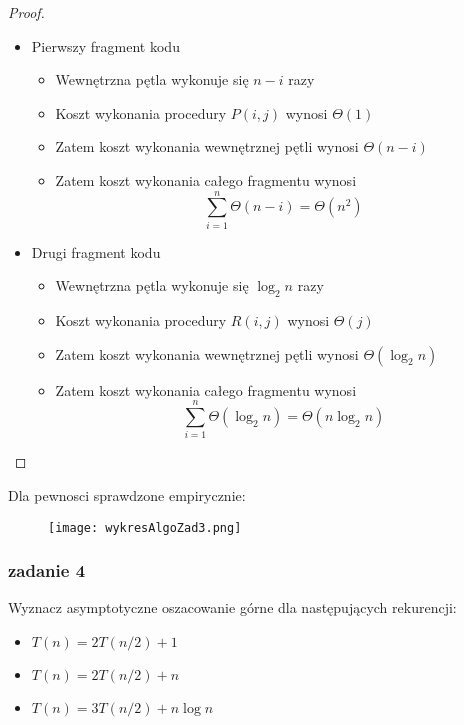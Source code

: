 \documentclass[11pt,a4paper]{article}
\begin{document}
\begin{proof}
    \begin{itemize}
        \item Pierwszy fragment kodu
            \begin{itemize}
                \item Wewnętrzna pętla wykonuje się $n-i$ razy
                \item Koszt wykonania procedury $P(i,j)$ wynosi $\Theta(1)$
                \item Zatem koszt wykonania wewnętrznej pętli wynosi $\Theta(n-i)$
                \item Zatem koszt wykonania całego fragmentu wynosi
                    \[
                        \sum_{i=1}^{n} \Theta(n-i) = \Theta(n^2)
                    \]
            \end{itemize}
        \item Drugi fragment kodu
            \begin{itemize}
                \item Wewnętrzna pętla wykonuje się $\log_2 n$ razy
                \item Koszt wykonania procedury $R(i,j)$ wynosi $\Theta(j)$
                \item Zatem koszt wykonania wewnętrznej pętli wynosi $\Theta(\log_2 n)$
                \item Zatem koszt wykonania całego fragmentu wynosi
                    \[
                        \sum_{i=1}^{n} \Theta(\log_2 n) = \Theta(n \log_2 n)
                    \]
            \end{itemize}
    \end{itemize}
\end{proof}
Dla pewnosci sprawdzone empirycznie:
\begin{figure}[H]
    \centering
    \texttt{[image: wykresAlgoZad3.png]}
\end{figure}

\subsubsection{zadanie 4}
Wyznacz asymptotyczne oszacowanie górne dla następujących rekurencji:

\begin{itemize}
    \item $T(n) = 2T(n/2) + 1$
    \item $T(n) = 2T(n/2) + n$
    \item $T(n) = 3T(n/2) + n \log n$
\end{itemize}
\end{document}
